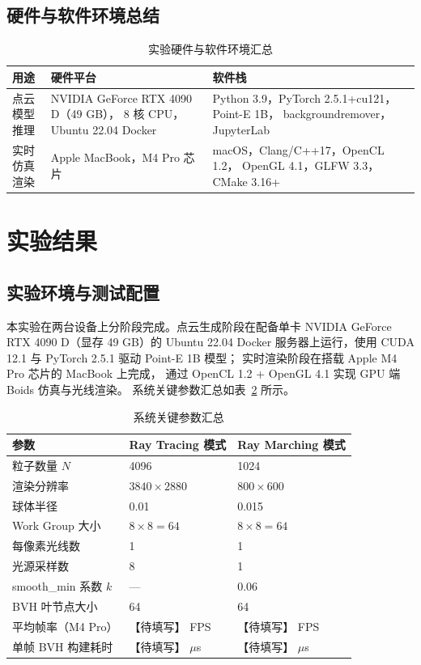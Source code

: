 \subsection{硬件与软件环境总结}

\begin{table}[htbp]
  \centering
  \caption{实验硬件与软件环境汇总}
  \label{tab:env}
  \begin{tabular}{p{2.2cm}p{5cm}p{6.5cm}}
    \hline
    \textbf{用途} & \textbf{硬件平台} & \textbf{软件栈} \\
    \hline
    点云模型推理 &
      NVIDIA GeForce RTX 4090 D（49 GB），
      8 核 CPU，Ubuntu 22.04 Docker &
      Python 3.9，PyTorch 2.5.1+cu121，Point-E 1B，
      backgroundremover，JupyterLab \\
    \hline
    实时仿真渲染 &
      Apple MacBook，M4 Pro 芯片 &
      macOS，Clang/C++17，OpenCL 1.2，
      OpenGL 4.1，GLFW 3.3，CMake 3.16+ \\
    \hline
  \end{tabular}
\end{table}


\section{实验结果}

\subsection{实验环境与测试配置}

本实验在两台设备上分阶段完成。点云生成阶段在配备单卡
NVIDIA GeForce RTX 4090 D（显存 49 GB）的 Ubuntu 22.04 Docker
服务器上运行，使用 CUDA 12.1 与 PyTorch 2.5.1 驱动 Point-E 1B 模型；
实时渲染阶段在搭载 Apple M4 Pro 芯片的 MacBook 上完成，
通过 OpenCL 1.2 + OpenGL 4.1 实现 GPU 端 Boids 仿真与光线渲染。
系统关键参数汇总如表~\ref{tab:params} 所示。

\begin{table}[htbp]
  \centering
  \caption{系统关键参数汇总}
  \label{tab:params}
  \begin{tabular}{lll}
    \hline
    \textbf{参数} & \textbf{Ray Tracing 模式} & \textbf{Ray Marching 模式} \\
    \hline
    粒子数量 $N$ & 4096 & 1024 \\
    渲染分辨率 & $3840\times2880$ & $800\times600$ \\
    球体半径 & 0.01 & 0.015 \\
    Work Group 大小 & $8\times8=64$ & $8\times8=64$ \\
    每像素光线数 & 1 & 1 \\
    光源采样数 & 8 & 1 \\
    smooth\_min 系数 $k$ & — & 0.06 \\
    BVH 叶节点大小 & 64 & 64 \\
    平均帧率（M4 Pro） & 【待填写】 FPS & 【待填写】 FPS \\
    单帧 BVH 构建耗时 & 【待填写】 $\mu$s & 【待填写】 $\mu$s \\
    \hline
  \end{tabular}
\end{table}

